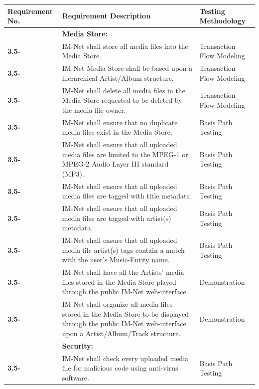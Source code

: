\documentclass[letterpaper,12pt]{article}
\newcounter{rcounter}							%
\newcommand\rnumber{\stepcounter{rcounter}\arabic{rcounter}}
\begin{document}
{\begin{center}
\begin{tabular}{|l|p{4in}|p{2in}|}
\end{tabular} 
\end{center}

\setcounter{rcounter}{0}
\begin{center}
\begin{tabular}{|l|p{4in}|p{2in}|}
\hline 
Requirement No. & Requirement Description & Testing Methodology \\
\hline
& \textbf{Media Store:} & \\
\hline
\textbf{3.5-\rnumber} & IM-Net shall store all media files into the Media Store. & Transaction Flow Modeling \\ 
\hline
\textbf{3.5-\rnumber} & IM-Net Media Store shall be based upon a hierarchical Artist/Album structure. & Transaction Flow Modeling \\ 
\hline
\textbf{3.5-\rnumber} & IM-Net shall delete all media files in the Media Store requested to be deleted by the media file owner. & Transaction Flow Modeling \\ 
\hline
\textbf{3.5-\rnumber} & IM-Net shall ensure that no duplicate media files exist in the Media Store. & Basis Path Testing \\ 
\hline
\textbf{3.5-\rnumber} & IM-Net shall ensure that all uploaded media files are limited to the MPEG-1 or MPEG-2 Audio Layer III standard (MP3). & Basis Path Testing \\ 
\hline
\textbf{3.5-\rnumber} & IM-Net shall ensure that all uploaded media files are tagged with title metadata. & Basis Path Testing \\ 
\hline
\textbf{3.5-\rnumber} & IM-Net shall ensure that all uploaded media files are tagged with artist(s) metadata. & Basis Path Testing \\ 
\hline
\textbf{3.5-\rnumber} & IM-Net shall ensure that all uploaded media file artist(s) tags contain a match with the user's Music-Entity name. & Basis Path Testing \\ 
\hline
\textbf{3.5-\rnumber} & IM-Net shall have all the Artists' media files stored in the Media Store played through the public IM-Net web-interface. & Demonstration \\ 
\hline
\textbf{3.5-\rnumber} & IM-Net shall organize all media files stored in the Media Store to be displayed through the public IM-Net web-interface upon a Artist/Album/Track structure. & Demonstration \\ 
\hline
& \textbf{Security:} & \\
\hline
\textbf{3.5-\rnumber} & IM-Net shall check every uploaded media file for malicious code using anti-virus software. & Basis Path Testing \\ 

\end{tabular}
\end{center}}
\end{document}
